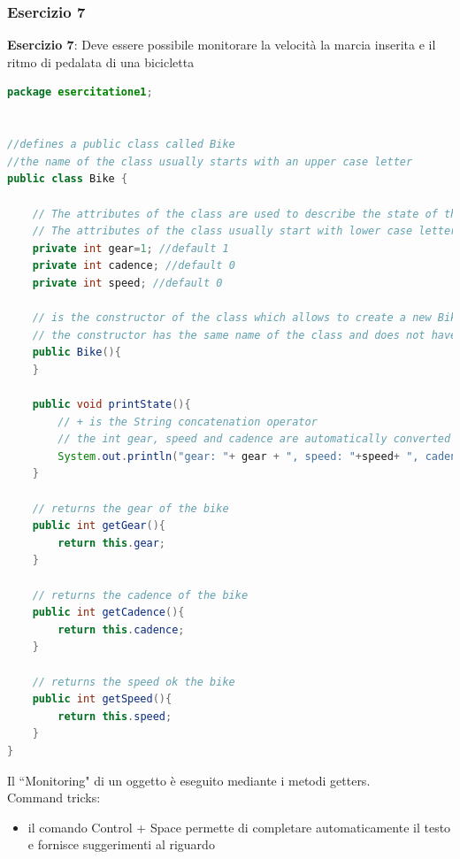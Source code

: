 \documentclass{article}
\theoremstyle{definition}
\begin{document}
\subsubsection{Esercizio 7}
\begin{framed}
\textbf{Esercizio 7}: Deve essere possibile monitorare la velocit\`a la marcia inserita e il ritmo di pedalata di una bicicletta 
\end{framed}


\begin{lstlisting}[language=Java,escapechar=|]
package esercitatione1;


//defines a public class called Bike 
//the name of the class usually starts with an upper case letter
public class Bike {
	
	// The attributes of the class are used to describe the state of the class and are usually private or protected 
	// The attributes of the class usually start with lower case letters
	private int gear=1; //default 1
	private int cadence; //default 0
	private int speed; //default 0
	
	// is the constructor of the class which allows to create a new Bike
	// the constructor has the same name of the class and does not have a return type
	public Bike(){
	}
	
	public void printState(){
	    // + is the String concatenation operator
	    // the int gear, speed and cadence are automatically converted into String
		System.out.println("gear: "+ gear + ", speed: "+speed+ ", cadence: "+cadence);
	}
	
	// returns the gear of the bike
	public int getGear(){
		return this.gear;
	}

	// returns the cadence of the bike
	public int getCadence(){
		return this.cadence;
	}
	
	// returns the speed ok the bike
	public int getSpeed(){
		return this.speed;
	}
}
\end{lstlisting}

Il ``Monitoring" di un oggetto \`e eseguito mediante i metodi getters.\\
Command tricks:
\begin{itemize}
\item il comando Control + Space permette di completare automaticamente il testo e fornisce suggerimenti al riguardo
\end{itemize}
\end{document}
